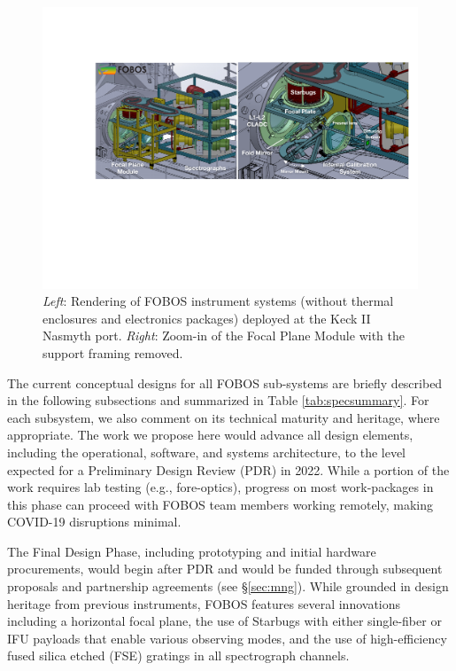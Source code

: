 \documentclass[oneside,11pt]{amsart}
\begin{document}
\begin{figure}[h!]
\vskip -0.1in
\includegraphics[width=\textwidth]{figs/FOBOS_inst_FPzoom_v2.pdf}
\caption{\small {\it Left}: Rendering of FOBOS instrument systems (without thermal enclosures and electronics packages) deployed at the Keck II Nasmyth port. {\it Right}: Zoom-in of the Focal Plane Module with the support framing removed.}
\label{fig:layout}
\end{figure}

\noindent The current conceptual designs for all FOBOS sub-systems are briefly described in the following subsections and summarized in Table \ref{tab:specsummary}.  For each subsystem, we also comment on its technical maturity and heritage, where appropriate.  The work we propose here would advance all design elements, including the operational, software, and systems architecture, to the level expected for a Preliminary Design Review (PDR) in 2022.  While a portion of the work requires lab testing (e.g., fore-optics), progress on most work-packages in this phase can proceed with FOBOS team members working remotely, making COVID-19 disruptions minimal.

The Final Design Phase, including prototyping and initial hardware procurements, would begin after PDR and would be funded through subsequent proposals and partnership agreements (see \S\ref{sec:mng}).  While grounded in design heritage from previous instruments, FOBOS features several innovations including a horizontal focal plane, the use of Starbugs with either single-fiber or IFU payloads that enable various observing modes, and the use of high-efficiency fused silica etched (FSE) gratings in all spectrograph channels.
\end{document}
